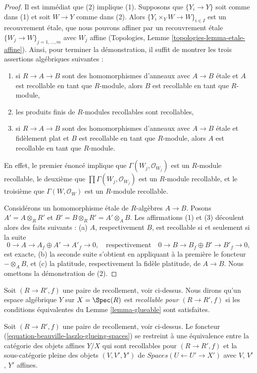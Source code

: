 \begin{proof}
Il est immédiat que (2) implique (1). Supposons que $\{Y_i \to Y\}$
soit comme dans (1) et soit $W \to Y$ comme dans (2). Alors
$\{Y_i \times_Y W \to W\}_{i \in I}$ est un recouvrement \'etale,
que nous pouvons affiner par un recouvrement \'etale
$\{W_j \to W\}_{j = 1, \ldots, m}$ avec $W_j$ affine
(Topologies, Lemme \ref{topologies-lemma-etale-affine}).
Ainsi, pour terminer la démonstration, il suffit de montrer
les trois assertions algébriques suivantes :
\begin{enumerate}
\item si $R \to A \to B$ sont des homomorphismes d'anneaux avec $A \to B$ \'etale
et $A$ est recollable en tant que $R$-module, alors $B$ est recollable en tant que
$R$-module,
\item les produits finis de $R$-modules recollables sont recollables,
\item si $R \to A \to B$ sont des homomorphismes d'anneaux avec $A \to B$ \'etale et fidèlement plat
et $B$ est recollable en tant que $R$-module, alors $A$ est recollable en tant que $R$-module.  
\end{enumerate}
  
En effet, le premier énoncé implique que $\Gamma(W_j, \mathcal{O}_{W_j})$ est un $R$-module recollable, le deuxième que $\prod \Gamma(W_j, \mathcal{O}_{W_j})$ est un $R$-module recollable, et le troisième que $\Gamma(W, \mathcal{O}_W)$ est un $R$-module recollable.

\medskip\noindent
Considérons un homomorphisme \'etale de $R$-algèbres $A \to B$. Posons $A' = A \otimes_R R'$ et $B' = B \otimes_R R' = A' \otimes_A B$.
Les affirmations (1) et (3) découlent alors des faits suivants :
(a) $A$, respectivement $B$, est recollable si et seulement si la suite $$
0 \to A \to A_f \oplus A' \to A'_f \to 0,
\quad\text{respectivement}\quad
0 \to B \to B_f \oplus B' \to B'_f \to 0,
$$
est exacte, (b) la seconde suite s'obtient en appliquant à la première le foncteur $- \otimes_A B$, et (c) la platitude, respectivement la fidèle platitude, de $A \to B$. Nous omettons la démonstration de (2).
\end{proof}

\noindent
Soit $(R \to R', f)$ une paire de recollement, voir ci-dessus.
Nous dirons qu'un espace algébrique $Y$ sur $X = \Spec(R)$
est {\it recollable pour $(R \to R', f)$}
si les conditions équivalentes du Lemme \ref{lemma-glueable}
sont satisfaites.

\begin{lemma}
\label{lemma-glueing-affines}
Soit $(R \to R', f)$ une paire de recollement, voir ci-dessus.
Le foncteur (\ref{equation-beauville-laszlo-glueing-spaces})
se restreint à une équivalence entre la catégorie des objets affines
$Y/X$ qui sont recollables pour $(R \to R', f)$ et la
sous-catégorie pleine des objets $(V, V', Y')$ de
$\textit{Spaces}(U \leftarrow U' \to X')$
avec $V$, $V'$, $Y'$ affines.
\end{lemma}

